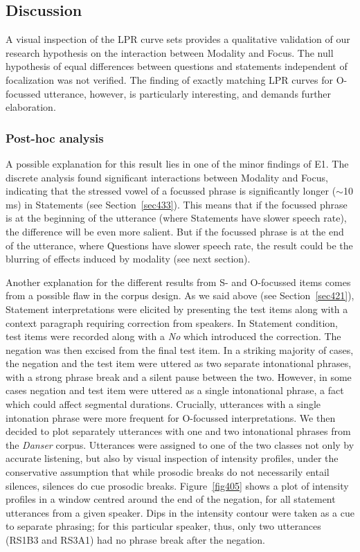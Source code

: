 \subsection{Discussion}\label{sec444}
A visual inspection of the LPR curve sets provides a qualitative validation of our research hypothesis on the interaction between Modality and Focus. The null hypothesis of equal differences between questions and statements independent of focalization was not verified. The finding of exactly matching LPR curves for O-focussed utterance, however, is particularly interesting, and demands further elaboration.

\subsubsection{Post-hoc analysis}\label{sec4441}
A possible explanation for this result lies in one of the minor findings of E1. The discrete analysis found significant interactions between Modality and Focus, indicating that the stressed vowel of a focussed phrase is significantly longer ($ \sim $10 ms) in Statements (see Section~\ref{sec433}). This means that if the focussed phrase is at the beginning of the utterance (where Statements have slower speech rate), the difference will be even more salient. But if the focussed phrase is at the end of the utterance, where Questions have slower speech rate, the result could be the blurring of effects induced by modality (see next section).

Another explanation for the different results from S- and O-focussed items comes from a possible flaw in the corpus design. As we said above (see Section~\ref{sec421}), Statement interpretations were elicited by presenting the test items along with a context paragraph requiring correction from speakers. In Statement condition, test items were recorded along with a \textit{No} which introduced the correction. The negation was then excised from the final test item. In a striking majority of cases, the negation and the test item were uttered as two separate intonational phrases, with a strong phrase break and a silent pause between the two. However, in some cases negation and test item were uttered as a single intonational phrase, a fact which could affect segmental durations. Crucially, utterances with a single intonation phrase were more frequent for O-focussed interpretations. We then decided to plot separately utterances with one and two intonational phrases from the \textit{Danser} corpus. Utterances were assigned to one of the two classes not only by accurate listening, but also by visual inspection of intensity profiles, under the conservative assumption that while prosodic breaks do not necessarily entail silences, silences do cue prosodic breaks. Figure~\ref{fig405} shows a plot of intensity profiles in a window centred around the end of the negation, for all statement utterances from a given speaker. Dips in the intensity contour were taken as a cue to separate phrasing; for this particular speaker, thus, only two utterances (RS1B3 and RS3A1) had no phrase break after the negation.

